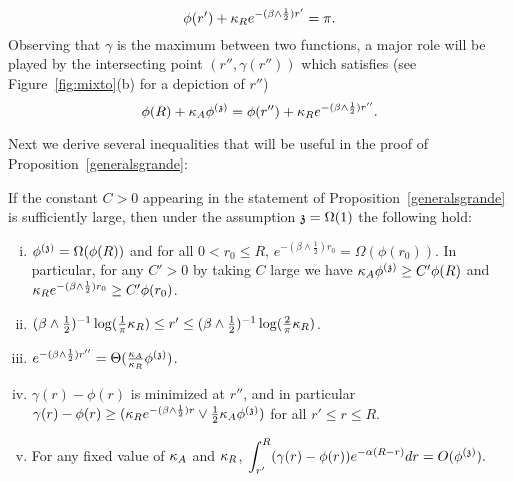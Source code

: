 \begin{equation}\label{eq:def:rprime}
\phi(r')+\KR e^{-(\beta\wedge\frac12) r'}=\pi.
\end{equation}
Observing that $\gamma$ is the maximum between two functions, a major role will be played by the intersecting point $(r'',\gamma(r''))$ which satisfies (see Figure~\ref{fig:mixto}(b) for a depiction of $r''$)
\begin{equation}\label{eq:def:r2prime}
\phi(R)+\KA\phis=\phi(r'')+\KR e^{-(\beta\wedge\frac12) r''}.
\end{equation}
\smallskip

Next we derive several inequalities that will be useful in the proof of Proposition~\ref{generalsgrande}:
\begin{fact}\label{fact:uppermix}
If the constant $C>0$ appearing in the statement of Proposition~\ref{generalsgrande} is sufficiently large, then under the assumption $\ss=\Omega(1)$ the following hold:
\begin{enumerate}[(i)]
\item\label{itm:upp1} $\phis=\Omega(\phi(R))$ and for all $0<r_0\leq R$, $e^{-(\beta\wedge\frac12) r_0}=\Omega(\phi(r_0))$. In particular, for any $C'>0$ by taking $C$ large we have $\KA\phis\geq C'\phi(R)$ and $\KR e^{-(\beta\wedge\frac12) r_0}\geq C'\phi(r_0)$.
\item\label{itm:upp2} $(\beta\wedge\frac12)^{-1}\log(\frac{1}{\pi} \KR)\leq r'\leq (\beta\wedge\frac12)^{-1}\log(\frac{2}{\pi}\KR)$.
\item\label{itm:upp3} $e^{-(\beta\wedge\frac12) r''}=\Theta(\tfrac{\KA}{\KR}\phis)$.
\item\label{itm:upp4} $\gamma(r)-\phi(r)$ is minimized at $r''$, and in particular %
$\gamma(r)-\phi(r)\geq(\KR e^{-(\beta\wedge \frac{1}{2})r}\vee\tfrac{1}{2}\KA\phis)$ for all $r'\leq r\leq R$.
\item\label{itm:upp5} For any fixed value of $\KA$ and $\KR$,  $\displaystyle\int_{r'}^R(\gamma(r)-\phi(r))e^{-\alpha(R-r)}dr=O(\phis).$
\end{enumerate}
\end{fact}
